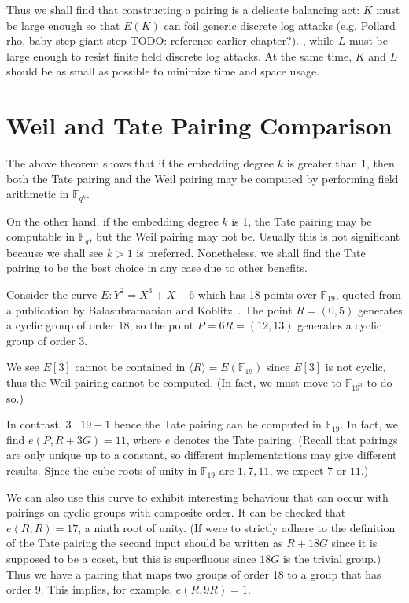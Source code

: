 Thus we shall find that constructing a pairing is a delicate balancing act:
$K$ must be large enough
so that $E(K)$ can foil generic discrete log attacks
(e.g. Pollard rho, baby-step-giant-step TODO: reference earlier chapter?).
, while $L$ must be
large enough to resist finite field discrete log attacks. At the same time,
$K$ and $L$ should be as small as possible to minimize time and space
usage.

\section {Weil and Tate Pairing Comparison}

The above theorem shows that if the embedding degree $k$ is greater than 1,
then both the Tate pairing and the Weil pairing may be computed by
performing field arithmetic in $\mathbb{F}_{q^k}$.

On the other hand, if the embedding degree $k$ is 1, the Tate pairing may
be computable in $\mathbb{F}_q$, but the Weil pairing may not be.
Usually this is not significant because we shall see
$k > 1$ is preferred.
Nonetheless, we shall find the Tate pairing to be the best choice in
any case due to other benefits.

Consider the curve $E: Y^2 = X^3 + X + 6$ which has
18 points over $\mathbb{F}_{19}$, quoted from a publication by
Balasubramanian and Koblitz~\cite{bk}.
The point $R=(0,5)$ generates a cyclic group of order 18,
so the point $P = 6R = (12,13)$ generates a cyclic group of order 3.

We see $E[3]$ cannot be contained in $\langle R \rangle = E(\mathbb{F}_{19})$
since $E[3]$ is not cyclic, thus the Weil pairing cannot be computed.
(In fact, we must move to $\mathbb{F}_{19^3}$ to do so.)

In contrast, $3 \mid 19-1$ hence the Tate pairing can be
computed in $\mathbb{F}_{19}$. In fact, we find $e(P, R + 3G) = 11$, where
$e$ denotes the Tate pairing.
(Recall that pairings are only unique up to a constant, so different
implementations may give different results.
Sjnce the cube roots of unity in
$\mathbb{F}_{19}$ are $1, 7, 11$, we expect $7$ or $11$.)

We can also use this curve to exhibit
interesting behaviour that can occur with
pairings on cyclic groups with composite order.
It can be checked that $e(R, R) = 17$, a ninth root of unity.
(If were to strictly adhere to the definition of the Tate pairing
the second input should be written as $R + 18G$ since it is supposed to be
a coset, but this is superfluous since $18G$ is the trivial group.)
Thus we have a pairing that maps two groups of order 18
to a group that has order 9.
This implies, for example, $e(R, 9R) = 1$.

